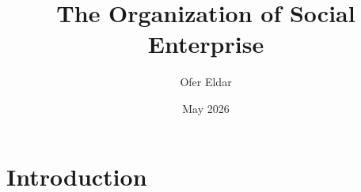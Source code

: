 \documentclass{article}
\title{The Organization of Social Enterprise}
\author{Ofer Eldar}
\date{May 2026}
\begin{document}
\maketitle

\section{Introduction}
\end{document}

